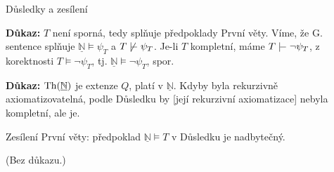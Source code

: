 \documentclass{beamer}
\begin{document}
\begin{frame}{Důsledky a zesílení}
    
    \pause
    
    \pause
    \textbf{Důkaz:}
        $T$ není sporná, tedy splňuje předpoklady První věty. Víme, že G. sentence splňuje $\underline{\mathbb N}\models\psi_T$ a $T\not\proves\psi_T$. Je-li $T$ kompletní, máme $T\proves\neg\psi_T$, z korektnosti $T\models\neg\psi_T$, tj. $\underline{\mathbb N}\models\neg\psi_T$, spor.
    \hfill\qedsymbol
    
    \medskip

    \pause

    \pause
    \textbf{Důkaz:}
    $\operatorname{Th}(\underline{\mathbb N})$ je extenze $Q$, platí v $\underline{\mathbb N}$. Kdyby byla rekurzivně axiomatizovatelná, podle Důsledku by [její rekurzivní axiomatizace] nebyla kompletní, ale je.
    \hfill\qedsymbol

    \medskip

    \pause
    Zesílení První věty: předpoklad $\underline{\mathbb N}\models T$ v Důsledku je nadbytečný.

    \pause

    (Bez důkazu.)

\end{frame}
\end{document}
